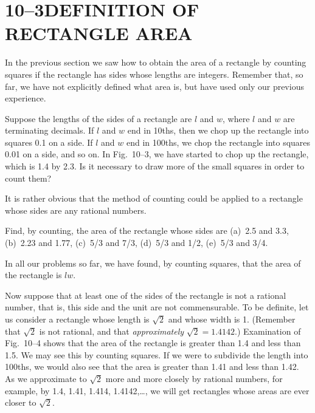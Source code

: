 \documentclass[11pt]{book}
\begin{document}
\section*{10--3\quad DEFINITION OF RECTANGLE AREA}

In the previous section we saw how to obtain the area of a rectangle by
counting squares if the rectangle has sides whose lengths are integers.
Remember that, so far, we have not explicitly defined what area is, but have
used only our previous experience.

\FIGXTHREE

Suppose the lengths of the sides of a rectangle are $l$ and $w$, where $l$ and
$w$ are terminating decimals. If $l$ and $w$ end in 10ths, then we chop up the
rectangle into squares 0.1 on a side. If $l$ and $w$ end in 100ths, we chop the
rectangle into squares 0.01 on a side, and so on. In Fig.~10--3, we have
started to chop up the rectangle, which is 1.4 by 2.3. Is it necessary to draw
more of the small squares in order to count them?

It is rather obvious that the method of counting could be applied to a
rectangle whose sides are any rational numbers.

\noindent Find, by counting, the area of the rectangle whose sides are
(a)~2.5 and 3.3, (b)~2.23 and 1.77, (c)~5/3 and 7/3, (d)~5/3 and 1/2,
(e)~5/3 and 3/4.

\medskip
In all our problems so far, we have found, by counting squares, that the area
of the rectangle is $lw$.

Now suppose that at least one of the sides of the rectangle is not a rational
number, that is, this side and the unit are not commensurable. To be definite,
let us consider a rectangle whose length is $\sqrt{2}$ and whose width is 1.
(Remember that $\sqrt{2}$ is not rational, and that \emph{approximately}
$\sqrt{2} = 1.4142$.) Examination of Fig.~10--4 shows that the area of the
rectangle is greater than 1.4 and less than 1.5. We may see this by counting
squares. If we were to subdivide the length into 100ths, we would also see
that the area is greater than 1.41 and less than 1.42. As we approximate to
$\sqrt{2}$ more and more closely by rational numbers, for example, by 1.4,
1.41, 1.414, 1.4142,\dots, we will get rectangles whose areas are ever closer
to $\sqrt{2}$.

\FIGXFOUR
\end{document}
